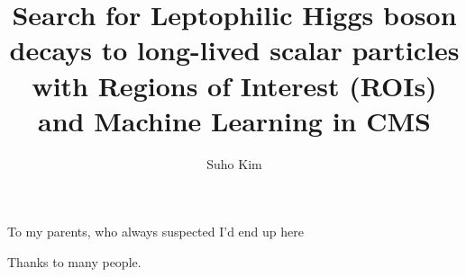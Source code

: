 \documentclass[11pt,expanded,copyright]{fsuthesis}
\title{Search for Leptophilic Higgs boson decays to long-lived scalar particles with Regions of Interest (ROIs) and Machine Learning in CMS}
\author{Suho Kim}  %
\begin{document}
\frontmatter          %
\maketitle            %
\makecommitteepage    %

\begin{dedication}
\centering
To my parents, who always suspected I'd end up here
\end{dedication}

\begin{acknowledgments}
Thanks to many people.
\end{acknowledgments}

\tableofcontents
\listoftables
\listoffigures


\end{document}

